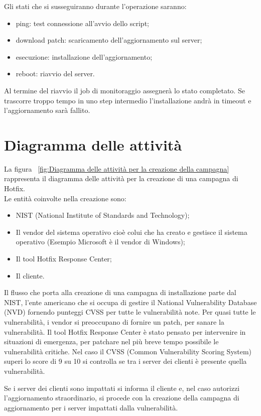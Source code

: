 Gli stati che si susseguiranno durante l’operazione saranno:
\begin{itemize}
\item ping: test connessione all’avvio dello script; 
\item download patch: scaricamento dell’aggiornamento sul server;
\item esecuzione: installazione dell’aggiornamento;
\item reboot: riavvio del server.
\end{itemize}
Al termine del riavvio il job di monitoraggio assegnerà lo stato 
completato. Se trascorre troppo tempo in uno step intermedio 
l’installazione andrà in timeout e l’aggiornamento sarà fallito.


\section{Diagramma delle attività}
La figura ~\ref{fig:Diagramma delle attività per la creazione della campagna} 
rappresenta il diagramma delle attività per la creazione di una campagna di Hotfix.\\

Le entità coinvolte nella creazione sono:
\begin{itemize}
\item NIST (National Institute of Standards and Technology);
\item Il vendor del sistema operativo cioè colui che ha creato e gestisce il 
sistema operativo (Esempio Microsoft è il vendor di Windows);
\item Il tool Hotfix Response Center;
\item Il cliente.
\end{itemize}

Il flusso che porta alla creazione di una campagna di installazione 
parte dal NIST, l’ente americano che si occupa di gestire il National 
Vulnerability Database (NVD) fornendo punteggi CVSS per tutte le 
vulnerabilità note. Per quasi tutte le vulnerabilità, i vendor si preoccupano 
di fornire un patch, per sanare la vulnerabilità.
Il tool Hotfix Response Center è stato pensato per intervenire in situazioni di 
emergenza, per patchare nel più breve tempo possibile le vulnerabilità critiche. 
Nel caso il CVSS (Common Vulnerability Scoring System) superi lo score di 9 su 
10 si controlla se tra i server dei clienti è presente quella vulnerabilità.

Se i server dei clienti sono impattati si informa il cliente e, nel caso autorizzi 
l’aggiornamento straordinario, si procede con la creazione della campagna di 
aggiornamento per i server impattati dalla vulnerabilità.

